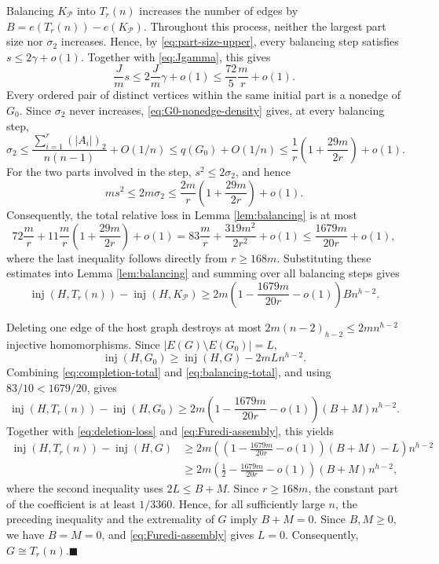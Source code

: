 \documentclass[11pt]{article}
\renewcommand{\qedsymbol}{$\blacksquare$}
\numberwithin{equation}{section}
\theoremstyle{definition}
\theoremstyle{remark}
\newcommand{\inj}{\operatorname{inj}}
\newcommand{\cP}{\mathcal P}
\begin{document}
Balancing $K_{\cP}$ into $T_r(n)$ increases the number of edges by $B=e(T_r(n))-e(K_{\cP})$. Throughout this process, neither the largest part size nor $\sigma_2$ increases. Hence, by \eqref{eq:part-size-upper}, every balancing step satisfies $s\le 2\gamma+o(1)$. Together with \eqref{eq:Jgamma}, this gives
\[
\frac{J}{m}s\le 2\frac{J}{m}\gamma+o(1)
\le \frac{72}{5}\frac{m}{r}+o(1).
\]
Every ordered pair of distinct vertices within the same initial part is a nonedge of $G_0$. Since $\sigma_2$ never increases, \eqref{eq:G0-nonedge-density} gives, at every balancing step,
\[
\sigma_2
\le \frac{\sum_{i=1}^r(|A_i|)_2}{n(n-1)}+O(1/n)
\le q(G_0)+O(1/n)
\le \frac1r\left(1+\frac{29m}{2r}\right)+o(1).
\]
For the two parts involved in the step, $s^2\le2\sigma_2$, and hence
\[
ms^2\le 2m\sigma_2
\le \frac{2m}{r}\left(1+\frac{29m}{2r}\right)+o(1).
\]
Consequently, the total relative loss in Lemma \ref{lem:balancing} is at most
\[
72\frac{m}{r}+11\frac{m}{r}\left(1+\frac{29m}{2r}\right)+o(1)
=83\frac{m}{r}+\frac{319m^2}{2r^2}+o(1)
\le \frac{1679m}{20r}+o(1),
\]
where the last inequality follows directly from $r\ge168m$. Substituting these estimates into Lemma \ref{lem:balancing} and summing over all balancing steps gives
\begin{equation}
\label{eq:balancing-total}
\inj(H,T_r(n))-\inj(H,K_{\cP})
\ge 2m\left(1-\frac{1679m}{20r}-o(1)\right)Bn^{h-2}.
\end{equation}

Deleting one edge of the host graph destroys at most $2m(n-2)_{h-2}\le 2mn^{h-2}$ injective homomorphisms. Since $|E(G)\setminus E(G_0)|=L$,
\begin{equation}
\label{eq:deletion-loss}
\inj(H,G_0)\ge \inj(H,G)-2mLn^{h-2}.
\end{equation}
Combining \eqref{eq:completion-total} and \eqref{eq:balancing-total}, and using $83/10<1679/20$, gives
\[
\inj(H,T_r(n))-\inj(H,G_0)
\ge 2m\left(1-\frac{1679m}{20r}-o(1)\right)(B+M)n^{h-2}.
\]
Together with \eqref{eq:deletion-loss} and \eqref{eq:Furedi-assembly}, this yields
\begin{align*}
\inj(H,T_r(n))-\inj(H,G)
&\ge 2m\left(\left(1-\frac{1679m}{20r}-o(1)\right)(B+M)-L\right)n^{h-2}\\
&\ge 2m\left(\frac12-\frac{1679m}{20r}-o(1)\right)(B+M)n^{h-2},
\end{align*}
where the second inequality uses $2L\le B+M$. Since $r\ge168m$, the constant part of the coefficient is at least $1/3360$. Hence, for all sufficiently large $n$, the preceding inequality and the extremality of $G$ imply $B+M=0$. Since $B,M\ge0$, we have $B=M=0$, and \eqref{eq:Furedi-assembly} gives $L=0$. Consequently, $G\cong T_r(n)$.\hfill\qedsymbol
\end{document}
